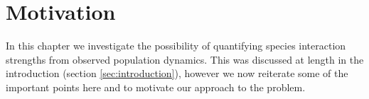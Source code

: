 





\section{Motivation}
\label{sec:motivate_interactions}
In this chapter we investigate the possibility of quantifying species interaction strengths from observed population dynamics. This was discussed at length in the introduction (section \ref{sec:introduction}), however we now reiterate some of the important points here and to motivate our approach to the problem.


